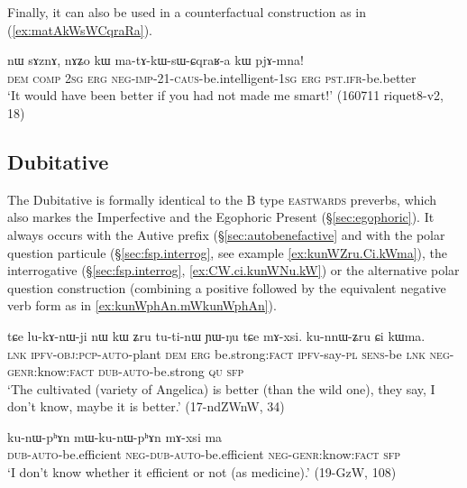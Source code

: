 Finally, it can also be used in a counterfactual construction as in (\ref{ex:matAkWsWCqraRa}).

\begin{exe}
\ex  \label{ex:matAkWsWCqraRa}
\gll nɯ sɤznɤ, nɤʑo kɯ ma-tɤ-kɯ-sɯ-ɕqraʁ-a kɯ pjɤ-mna! \\
\textsc{dem} \textsc{comp} \textsc{2sg} \textsc{erg} \textsc{neg}-\textsc{imp}-2\fl{}1-\textsc{caus}-be.intelligent-\textsc{1sg} \textsc{erg} \textsc{pst}.\textsc{ifr}-be.better \\
\glt `It would have been better if you had not made me smart!' (160711 riquet8-v2, 18)
\end{exe}

\subsection{Dubitative} \label{sec:dubitative}
 The Dubitative  is formally identical to the B type \textsc{eastwards} preverbs, which also markes the Imperfective and the Egophoric Present (§\ref{sec:egophoric}). It always occurs with the Autive  prefix (§\ref{sec:autobenefactive}  and with the polar question  particule (§\ref{sec:fsp.interrog}, see example \ref{ex:kunWZru.Ci.kWma}), the interrogative  (§\ref{sec:fsp.interrog}, \ref{ex:CW.ci.kunWNu.kW}) or the alternative polar question construction (combining a positive followed by the equivalent negative verb form as in \ref{ex:kunWphAn.mWkunWphAn}).
 
 \begin{exe}
\ex \label{ex:kunWZru.Ci.kWma}
 \gll  tɕe lu-kɤ-nɯ-ji nɯ kɯ ʑru tu-ti-nɯ ɲɯ-ŋu tɕe mɤ-xsi. ku-nnɯ-ʑru ɕi kɯma. \\
 \textsc{lnk} \textsc{ipfv}-\textsc{obj}:\textsc{pcp}-\textsc{auto}-plant \textsc{dem} \textsc{erg} be.strong:\textsc{fact} \textsc{ipfv}-say-\textsc{pl} \textsc{sens}-be \textsc{lnk} \textsc{neg}-\textsc{genr}:know:\textsc{fact}  \textsc{dub}-\textsc{auto}-be.strong \textsc{qu} \textsc{sfp} \\
 \glt `The cultivated (variety of Angelica) is better (than the wild one), they say, I don't know, maybe it is better.' (17-ndZWnW, 34)
 \end{exe}
 

\begin{exe}
\ex \label{ex:kunWphAn.mWkunWphAn}
 \gll  ku-nɯ-pʰɤn mɯ-ku-nɯ-pʰɤn mɤ-xsi ma \\
 \textsc{dub}-\textsc{auto}-be.efficient \textsc{neg}-\textsc{dub}-\textsc{auto}-be.efficient \textsc{neg}-\textsc{genr}:know:\textsc{fact} \textsc{sfp} \\
\glt `I don't know whether it efficient or not (as medicine).' (19-GzW, 108)
  \end{exe}

